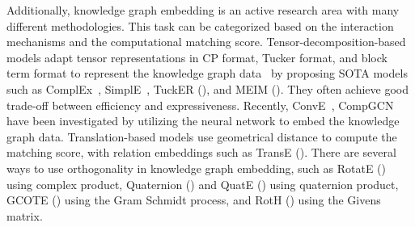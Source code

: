 Additionally, knowledge graph embedding is an active research area with many different methodologies. This task can be categorized based on the interaction mechanisms and the computational matching score. Tensor-decomposition-based models adapt tensor representations in CP format, Tucker format, and block term format to represent the knowledge graph data~\citep{kolda2009tensor} by proposing SOTA models such as ComplEx~\citep{trouillon2016complex}, SimplE~\citep{kazemi2018simple}, TuckER (\citep{balavzevic2019tucker}), and MEIM (\citet{DBLP:conf/ijcai/TranT22}). They often achieve good trade-off between efficiency and expressiveness. Recently, ConvE~\citep{dettmers2018convolutional}, CompGCN~\citep{vashishthcomposition} have been investigated by utilizing the neural network to embed the knowledge graph data. Translation-based models use geometrical distance to compute the matching score, with relation embeddings such as TransE (\citet{bordes2013translating}).  There are several ways to use orthogonality in knowledge graph embedding, such as RotatE (\citet{sunrotate}) using complex product, Quaternion (\citet{tran2019analyzing}) and QuatE (\citet{zhang2019quaternion}) using quaternion product, GCOTE (\citet{tang2020orthogonal}) using the Gram Schmidt process, and RotH (\citet{chami2020low}) using the Givens matrix.


